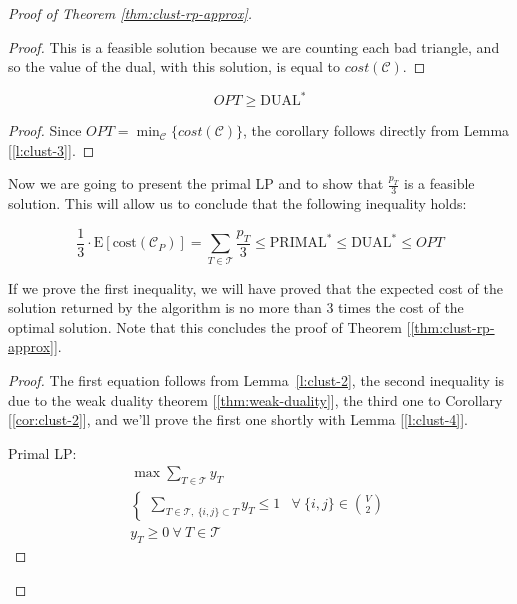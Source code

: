 \begin{proof}[Proof of Theorem \ref{thm:clust-rp-approx}]
\begin{proof}
        This is a feasible solution because we are counting each bad triangle, and so the value of the dual, with this solution, is equal to $cost(\mathscr{C})$.
    \end{proof}
    
    \begin{cor}\label{cor:clust-2}
        \begin{equation}
            OPT \geq \text{DUAL}^*
        \end{equation}
    \end{cor}
    \begin{proof}
        Since $OPT = \min_{\mathscr{C}} \{cost(\mathscr{C})\}$, the corollary follows directly from Lemma [\ref{l:clust-3}].
    \end{proof}

    Now we are going to present the primal LP and to show that $\frac{p_T}{3}$ is a feasible solution. This will allow us to conclude that the following inequality holds:
    \begin{claim}\label{cl:clust-ineq}
        \begin{equation}\label{eq:clust-ineq}
            \frac13 \cdot \text{E}[\text{cost}(\mathscr{C}_P)] =  \sum_{T \in \mathscr{T}} \frac{p_T}{3} \leq \text{PRIMAL}^* \leq \text{DUAL}^* \leq OPT
        \end{equation}
    \end{claim}

    \obs\label{obs:clust-ineq} If we prove the first inequality, we will have proved that the expected cost of the solution returned by the algorithm is no more than 3 times the cost of the optimal solution. Note that this concludes the proof of Theorem [\ref{thm:clust-rp-approx}].
    
    \begin{proof}
        The first equation follows from Lemma~\ref{l:clust-2}, the second inequality is due to the weak duality theorem [\ref{thm:weak-duality}], the third one to Corollary [\ref{cor:clust-2}], and we'll prove the first one shortly with Lemma [\ref{l:clust-4}].
    
        Primal LP:
        \begin{equation}\label{lp:clust-primal}
            \begin{aligned}
                &\max \sum_{T \in \mathscr{T}} y_T&\\
                &\begin{cases}
                    \sum_{T \in \mathscr{T},\ \{i,j\} \subset T} y_T \leq 1 & \forall\ \{i,j\} \in \binom{V}{2}
                \end{cases}&\\
                &y_T \geq 0 \ \forall\ T \in \mathscr{T}&
            \end{aligned}
        \end{equation}
        

\end{proof}
\end{proof}
